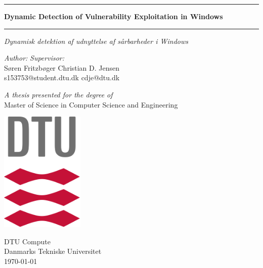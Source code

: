 \documentclass{report}
\begin{document}
\begin{titlepage}
    \begin{center}
        \par\noindent\rule{\textwidth}{0.4pt}
        \Large
        \textbf{Dynamic Detection of Vulnerability Exploitation in Windows}

        \par\noindent\rule{\textwidth}{0.4pt}

        \vspace{0.5cm}
        \large
        \emph{Dynamisk detektion af udnyttelse af sårbarheder i Windows}

        \vspace{1cm}
        \emph{Author:}      \hfill     \emph{Supervisor:} \\
        Søren Fritzbøger    \hfill     Christian D. Jensen
        \\
        s153753@student.dtu.dk             \hfill     cdje@dtu.dk

        \vfill

        \emph{A thesis presented for the degree of}\\
        Master of Science in Computer Science and Engineering

        \vspace{0.8cm}

        \includegraphics[width=0.3\textwidth]{figures/dtulogo}

        \Large
        DTU Compute\\
        Danmarks Tekniske Universitet\\
        \vfill
        \today

    \end{center}
\end{titlepage}
\end{document}
